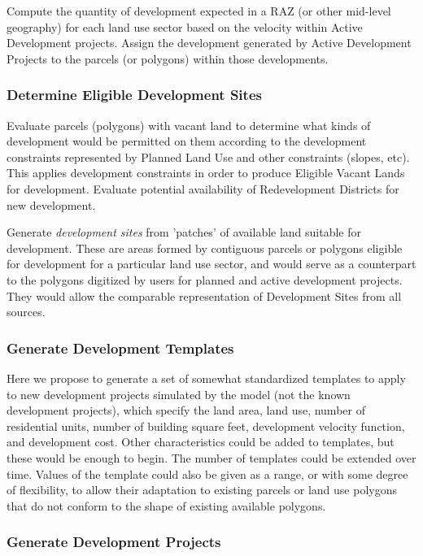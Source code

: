 Compute the quantity of development expected in a RAZ (or other mid-level geography) for each land use
sector based on the velocity within Active Development projects. Assign the development generated
by Active Development Projects to the parcels (or polygons) within those developments.

\subsubsection{Determine Eligible Development Sites}

Evaluate parcels (polygons) with vacant land to determine what kinds of development would be
permitted on them
according to the development constraints represented by Planned Land Use and other constraints
(slopes, etc).  This applies development constraints in order to produce Eligible Vacant Lands for
development. Evaluate potential availability of Redevelopment Districts for new development.

Generate \emph{development sites} from 'patches' of available land suitable for development.
These are
areas formed by contiguous parcels or polygons eligible for development for a particular land use
sector, and would serve as a counterpart to the polygons digitized by users for planned and active
development projects.  They would allow the comparable representation of Development Sites from all
sources.

\subsubsection{Generate Development Templates}
Here we propose to generate a set of somewhat standardized templates to apply to new development
projects simulated by the model (not the known development projects), which specify the land area,
land use, number of residential units, number of building square feet, development velocity function,
and development cost.  Other characteristics could be added to templates, but these would be enough
to begin.  The number of templates could be extended over time.  Values of the template could also
be given as a range, or with some degree of flexibility, to allow their adaptation to existing parcels
or land use polygons that do not conform to the shape of existing available polygons.

\subsubsection{Generate Development Projects}

